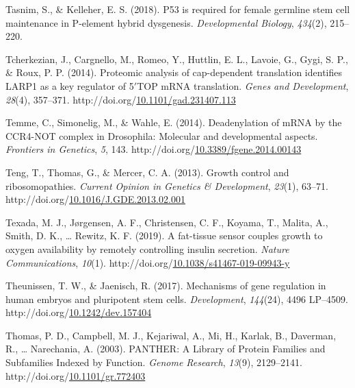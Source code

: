 \documentclass[12pt,oneside]{reedthesis}
\newlength{\cslhangindent}
\newenvironment{CSLReferences}[2] %
 {%
  \setlength{\parindent}{0pt}
  \ifodd #1 \everypar{\setlength{\hangindent}{\cslhangindent}}\ignorespaces\fi
  \ifnum #2 > 0
  \setlength{\parskip}{#2\baselineskip}
  \fi
 }%
 {}
\begin{document}
\begin{CSLReferences}{1}{0}
\leavevmode{}%
Tasnim, S., \& Kelleher, E. S. (2018). P53 is required for female germline stem cell maintenance in {P}-element hybrid dysgenesis. \emph{Developmental Biology}, \emph{434}(2), 215--220.

\leavevmode{}%
Tcherkezian, J., Cargnello, M., Romeo, Y., Huttlin, E. L., Lavoie, G., Gygi, S. P., \& Roux, P. P. (2014). Proteomic analysis of cap-dependent translation identifies {LARP1} as a key regulator of 5{\({'}\)}{TOP mRNA} translation. \emph{Genes and Development}, \emph{28}(4), 357--371. http://doi.org/\href{https://doi.org/10.1101/gad.231407.113}{10.1101/gad.231407.113}

\leavevmode{}%
Temme, C., Simonelig, M., \& Wahle, E. (2014). Deadenylation of {mRNA} by the {CCR4}-{NOT} complex in {Drosophila}: Molecular and developmental aspects. \emph{Frontiers in Genetics}, \emph{5}, 143. http://doi.org/\href{https://doi.org/10.3389/fgene.2014.00143}{10.3389/fgene.2014.00143}

\leavevmode{}%
Teng, T., Thomas, G., \& Mercer, C. A. (2013). Growth control and ribosomopathies. \emph{Current Opinion in Genetics \& Development}, \emph{23}(1), 63--71. http://doi.org/\href{https://doi.org/10.1016/J.GDE.2013.02.001}{10.1016/J.GDE.2013.02.001}

\leavevmode{}%
Texada, M. J., Jørgensen, A. F., Christensen, C. F., Koyama, T., Malita, A., Smith, D. K., \ldots{} Rewitz, K. F. (2019). A fat-tissue sensor couples growth to oxygen availability by remotely controlling insulin secretion. \emph{Nature Communications}, \emph{10}(1). http://doi.org/\href{https://doi.org/10.1038/s41467-019-09943-y}{10.1038/s41467-019-09943-y}

\leavevmode{}%
Theunissen, T. W., \& Jaenisch, R. (2017). Mechanisms of gene regulation in human embryos and pluripotent stem cells. \emph{Development}, \emph{144}(24), 4496 LP--4509. http://doi.org/\href{https://doi.org/10.1242/dev.157404}{10.1242/dev.157404}

\leavevmode{}%
Thomas, P. D., Campbell, M. J., Kejariwal, A., Mi, H., Karlak, B., Daverman, R., \ldots{} Narechania, A. (2003). {PANTHER}: {A Library} of {Protein Families} and {Subfamilies Indexed} by {Function}. \emph{Genome Research}, \emph{13}(9), 2129--2141. http://doi.org/\href{https://doi.org/10.1101/gr.772403}{10.1101/gr.772403}


\end{CSLReferences}
\end{document}
